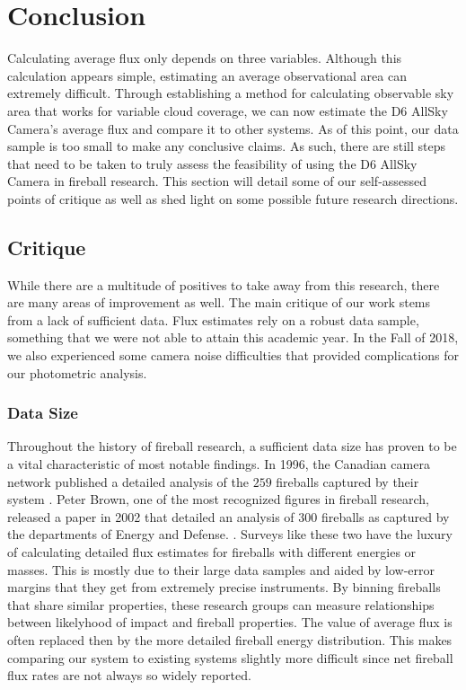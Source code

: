 
\chapter{Conclusion}

Calculating average flux only depends on three variables. 
Although this calculation appears simple, estimating an average observational area can extremely difficult. 
Through establishing a method for calculating observable sky area that works for variable cloud coverage, we can now estimate the D6 AllSky Camera's average flux and compare it to other systems.
As of this point, our data sample is too small to make any conclusive claims.  
As such, there are still steps that need to be taken to truly assess the feasibility of using the D6 AllSky Camera in fireball research.
This section will detail some of our self-assessed points of critique as well as shed light on some possible future research directions.


\section{Critique}

While there are a multitude of positives to take away from this research, there are many areas of improvement as well.  
The main critique of our work stems from a lack of sufficient data.
Flux estimates rely on a robust data sample, something that we were not able to attain this academic year. 
In the Fall of 2018, we also experienced some camera noise difficulties that provided complications for our photometric analysis.


\subsection{Data Size}

Throughout the history of fireball research, a sufficient data size has proven to be a vital characteristic of most notable findings.
In 1996, the Canadian camera network published a detailed analysis of the $259$ fireballs captured by their system \cite{halliday_innisfree_1981}.
Peter Brown, one of the most recognized figures in fireball research, released a paper in 2002 that detailed an analysis of $300$ fireballs as captured by the departments of Energy and Defense. \cite{brown_p_flux_2002}.
Surveys like these two have the luxury of calculating detailed flux estimates for fireballs with different energies or masses.
This is mostly due to their large data samples and aided by low-error margins that they get from extremely precise instruments.
By binning fireballs that share similar properties, these research groups can measure relationships between likelyhood of impact and fireball properties.
The value of average flux is often replaced then by the more detailed fireball energy distribution.
This makes comparing our system to existing systems slightly more difficult since net fireball flux rates are not always so widely reported.


